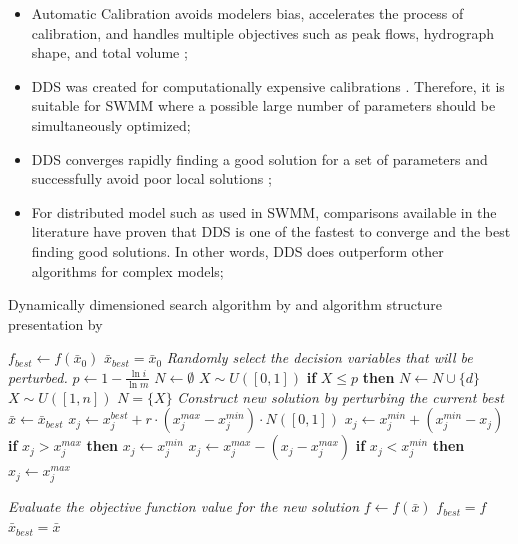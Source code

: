 \begin{itemize}
    \item Automatic Calibration avoids modelers bias, accelerates the process of calibration, and handles multiple objectives such as peak flows, hydrograph shape, and total volume \cite{dent2004};
    \item DDS was created for computationally expensive calibrations \cite{arsenault2013}. Therefore, it is suitable for SWMM where a possible large number of parameters should be simultaneously optimized;
    \item DDS converges rapidly finding a good solution for a set of parameters and successfully avoid poor local solutions \cite{tolson2007};
    \item For distributed model such as used in SWMM, comparisons available in the literature have proven that DDS is one of the fastest to converge and the best finding good solutions. In other words, DDS does outperform other algorithms for complex models\cite{tolson2007,wallner2012,arsenault2013};
\end{itemize}

\begin{algorithm}
	\caption{Dynamically dimensioned search algorithm by \citet{tolson2007} and algorithm structure presentation by \citet{Sunela2017}}
	\label{alg:dds}
	\begin{algorithmic}
		\State $f_{best} \gets f(\bar{x}_0)$
		\State $\bar{x}_{best} = \bar{x}_0$
		\State \textit{Randomly select the decision variables that will be perturbed.}
		\State $p \gets 1 - \frac{\ln{i}}{\ln{m}}$
		\State $N \gets \emptyset$
		\State $X \sim U([0, 1])$
		\State \textbf{if} $X \leq p$ \textbf{then}	$N \gets N \cup \{d\}$
		\EndFor
		\State $X \sim U([1, n])$
		\State $N = \{ X \}$
		\EndIf
		\State \textit{Construct new solution by perturbing the current best}
		\State $\bar{x} \gets \bar{x}_{best}$
		\State $x_j \gets x^{best}_j + r \cdot (x^{max}_j - x^{min}_j) \cdot N([0, 1])$		
		\State $x_j \gets x^{min}_j + (x^{min}_j - x_j)$
		\State \textbf{if} $x_j > x^{max}_j$ \textbf{then} $x_j \gets x^{min}_j$
		\State $x_j \gets x^{max}_j - (x_j - x^{max}_j)$
		\State \textbf{if} $x_j < x^{min}_j$ \textbf{then} $x_j \gets x^{max}_j$
		\EndIf
		\EndFor
		
		\State \textit{Evaluate the objective function value for the new solution}
		\State $f \gets f(\bar{x})$
		\State $f_{best} = f$
		\State $\bar{x}_{best} = \bar{x}$
		\EndIf
		\EndFor
	\end{algorithmic}	
\end{algorithm}



 

